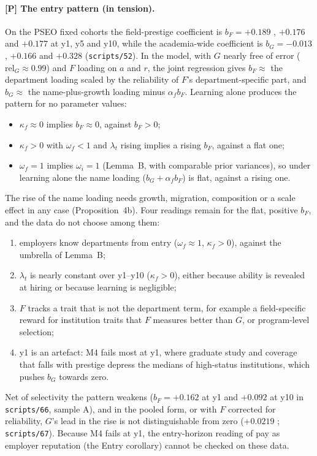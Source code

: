 \paragraph{[P] The entry pattern (in tension).} On the PSEO fixed cohorts the field-prestige coefficient is
$b_F=+0.189$ , $+0.176$ and $+0.177$ at y1, y5 and y10, while the academia-wide coefficient is
$b_G=-0.013$ , $+0.166$ and $+0.328$ (\texttt{scripts/52}). In the model, with $G$ nearly free of
error ($\mathrm{rel}_G\approx0.99$) and $F$ loading on $a$ and $r$, the joint regression gives $b_F\approx$ the
department loading scaled by the reliability of $F$'s department-specific part, and $b_G\approx$ the name-plus-growth
loading minus $\alpha_f b_F$. Learning alone produces the pattern for no parameter values:
\begin{itemize}
\item $\kappa_f\approx0$ implies $b_F\approx0$, against $b_F>0$;
\item $\kappa_f>0$ with $\omega_f<1$ and $\lambda_t$ rising implies a rising $b_F$, against a flat one;
\item $\omega_f=1$ implies $\omega_i=1$ (Lemma~B, with comparable prior variances), so under learning alone the
name loading ($b_G+\alpha_fb_F$) is flat, against a rising one.
\end{itemize}
The rise of the name loading needs growth, migration, composition or a scale effect in any case
(Proposition~4b). Four readings remain for the flat, positive $b_F$, and the data do not choose among them:
\begin{enumerate}
\item employers know departments from entry ($\omega_f\approx1$, $\kappa_f>0$), against the umbrella of Lemma~B;
\item $\lambda_t$ is nearly constant over y1--y10 ($\kappa_f>0$), either because ability is revealed at hiring
\citep{arcidiacono2010beyond} or because learning is negligible;
\item $F$ tracks a trait that is not the department term, for example a field-specific reward for institution
traits that $F$ measures better than $G$, or program-level selection;
\item y1 is an artefact: M4 fails most at y1, where graduate study and coverage that falls with prestige depress
the medians of high-status institutions, which pushes $b_G$ towards zero.
\end{enumerate}
Net of selectivity the pattern weakens ($b_F=+0.162$ at y1 and $+0.092$ at y10 in \texttt{scripts/66}, sample A),
and in the pooled form, or with $F$ corrected for reliability, $G$'s lead in the rise is not distinguishable from
zero ($+0.0219$ ; \texttt{scripts/67}). Because M4 fails at y1, the entry-horizon reading of
pay as employer reputation (the Entry corollary) cannot be checked on these data.

